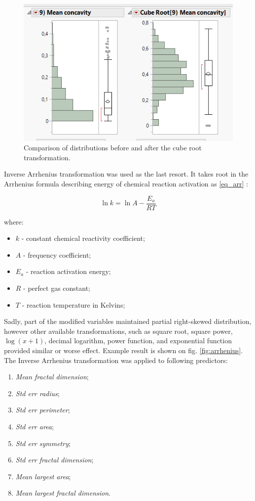 \begin{figure}[!ht]
	\centering
	\includegraphics[width=0.7\linewidth]{Rysunki/Rozdzial3/cube_root}
	\caption{Comparison of distributions before and after the cube root transformation.}
	\label{fig:cuberoot}
\end{figure}

	Inverse Arrhenius transformation was used as the last resort. It takes root in the Arrhenius formula describing energy of chemical reaction activation as \ref{eq_arr} \cite{arr}:
	
	\begin{equation}
		\ln k = \ln A - \frac{E_a}{RT}
		\label{eq_arr}
	\end{equation}

	\newpage
	where: 
	\begin{itemize}
		\item $k$ - constant chemical reactivity coefficient;
		\item $A$ - frequency coefficient;
		\item $E_a$ - reaction activation energy;
		\item $R$ - perfect gas constant;
		\item $T$ - reaction temperature in Kelvins;
	\end{itemize}
	
	Sadly, part of the modified variables maintained partial right-skewed distribution, however other available transformations, such as square root, square power, $\log(x+1)$, decimal logarithm, power function, and exponential function provided similar or worse effect. Example result is shown on fig. \ref{fig:arrhenius}. The Inverse Arrhenius transformation was applied to following predictors:
	
	\begin{enumerate}
		\item \textit{Mean fractal dimension};
		\item \textit{Std err radius};
		\item \textit{Std err perimeter};
		\item \textit{Std err area};
		\item \textit{Std err symmetry};
		\item \textit{Std err fractal dimension};
		\item \textit{Mean largest area};
		\item \textit{Mean largest fractal dimension}.
	\end{enumerate}
	
